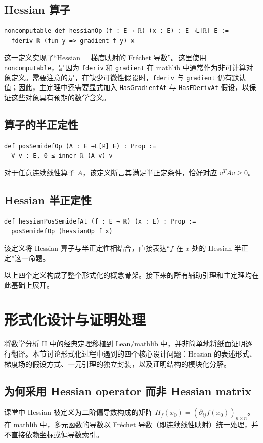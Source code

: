 ﻿\documentclass[UTF8,a4paper,zihao=-4]{ctexart}
\begin{document}
\subsection{Hessian 算子}
\begin{verbatim}
noncomputable def hessianOp (f : E → ℝ) (x : E) : E →L[ℝ] E :=
  fderiv ℝ (fun y => gradient f y) x
\end{verbatim}
这一定义实现了“Hessian = 梯度映射的 Fréchet 导数”。这里使用 \texttt{noncomputable}，是因为 \texttt{fderiv} 和 \texttt{gradient} 在 mathlib 中通常作为非可计算对象定义。需要注意的是，在缺少可微性假设时，\texttt{fderiv} 与 \texttt{gradient} 仍有默认值；因此，主定理中还需要显式加入 \texttt{HasGradientAt} 与 \texttt{HasFDerivAt} 假设，以保证这些对象具有预期的数学含义。

\subsection{算子的半正定性}
\begin{verbatim}
def posSemidefOp (A : E →L[ℝ] E) : Prop :=
  ∀ v : E, 0 ≤ inner ℝ (A v) v
\end{verbatim}
对于任意连续线性算子 \(A\)，该定义断言其满足半正定条件，恰好对应 \(v^T A v \ge 0\)。

\subsection{Hessian 半正定性}
\begin{verbatim}
def hessianPosSemidefAt (f : E → ℝ) (x : E) : Prop :=
  posSemidefOp (hessianOp f x)
\end{verbatim}
该定义将 Hessian 算子与半正定性相结合，直接表达“\(f\) 在 \(x\) 处的 Hessian 半正定”这一命题。

以上四个定义构成了整个形式化的概念骨架。接下来的所有辅助引理和主定理均在此基础上展开。

\section{形式化设计与证明处理}
将数学分析 II 中的经典定理移植到 Lean/mathlib 中，并非简单地将纸面证明逐行翻译。本节讨论形式化过程中遇到的四个核心设计问题：Hessian 的表述形式、梯度场的假设方式、一元引理的独立封装，以及证明结构的模块化分解。

\subsection{为何采用 Hessian operator 而非 Hessian matrix}
课堂中 Hessian 被定义为二阶偏导数构成的矩阵 \(H_f(x_0)=(\partial_{ij}f(x_0))_{n\times n}\)。在 mathlib 中，多元函数的导数以 Fréchet 导数（即连续线性映射）统一处理，并不直接依赖坐标或偏导数索引。
\end{document}
